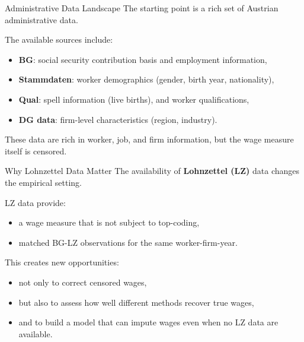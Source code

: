 \documentclass[10pt]{beamer}
\begin{document}
\begin{frame}{Administrative Data Landscape}
The starting point is a rich set of Austrian administrative data.

\vspace{0.3cm}
The available sources include:
\begin{itemize}
    \item \textbf{BG}: social security contribution basis and employment information,
    \item \textbf{Stammdaten}: worker demographics (gender, birth year, nationality),
    \item \textbf{Qual}: spell information (live births), and worker qualifications,
    \item \textbf{DG data}: firm-level characteristics (region, industry).
\end{itemize}

\vspace{0.3cm}
These data are rich in worker, job, and firm information, but the wage measure itself is censored.
\end{frame}

\begin{frame}{Why Lohnzettel Data Matter}
The availability of \textbf{Lohnzettel (LZ)} data changes the empirical setting.

\vspace{0.3cm}
LZ data provide:
\begin{itemize}
    \item a wage measure that is not subject to top-coding,
    \item matched BG-LZ observations for the same worker-firm-year.
\end{itemize}

\vspace{0.3cm}
This creates new opportunities:
\begin{itemize}
    \item not only to correct censored wages,
    \item but also to assess how well different methods recover true wages,
    \item and to build a model that can impute wages even when no LZ data are available.
\end{itemize}
\end{frame}
\end{document}
